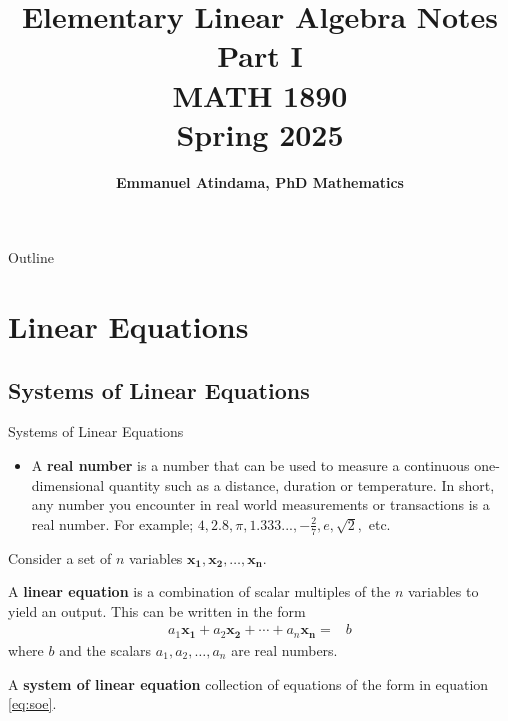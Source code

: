 \documentclass[10pt, aspectratio=169]{beamer}
\title{
Elementary Linear Algebra Notes Part I\\
MATH 1890\\
Spring 2025
}
\author{\textbf{Emmanuel Atindama, PhD Mathematics}}
\date{}
\begin{document}
\maketitle

\begin{frame}{Outline}
\tableofcontents 
\end{frame} 

\section{Linear Equations}
\subsection{Systems of Linear Equations}
\begin{frame}{Systems of Linear Equations}
    \begin{itemize}
        \item A \textbf{real number} is a number that can be used to measure a continuous one-dimensional quantity such as a distance, duration or temperature. 
        In short, any number you encounter in real world measurements or transactions is a real number.
        For example; \(4, 2.8, \pi, 1.333..., -\frac{2}{7}, e, \sqrt{2},\) etc.
    \end{itemize}

    Consider a set of \(n\) variables \(\mathbf{x_1},\mathbf{x_2},\ldots,\mathbf{x_n}\).
    
    A \textbf{linear equation} is a combination of scalar multiples of the \(n\) variables to yield an output.
    This can be written in the form
    \begin{align}\label{eq:soe}
        a_1\mathbf{x_1} + a_2\mathbf{x_2} + \cdots + a_n\mathbf{x_n} =& b
    \end{align}
    where \(b\) and the scalars \(a_1, a_2,\ldots,a_n\) are real numbers.
    
    A \textbf{system of linear equation} collection of equations of the form in equation \eqref{eq:soe}.
\end{frame}
\end{document}
